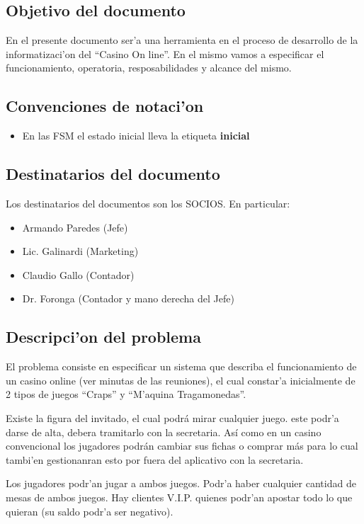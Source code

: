 \subsection{ Objetivo del documento	}

En el presente documento ser'a una herramienta en el proceso 
de desarrollo de la informatizaci'on del ``Casino On line''. En el mismo 
vamos a especificar el funcionamiento, operatoria, resposabilidades y alcance
del mismo.


\subsection{ Convenciones de notaci'on	}
\begin{itemize}
    \item En las FSM el estado inicial lleva la etiqueta \textbf{inicial}
\end{itemize}


\subsection{ Destinatarios del documento	}
Los destinatarios del documentos son los SOCIOS. En particular:

\begin{itemize}
    \item Armando Paredes (Jefe)
    \item Lic. Galinardi (Marketing)
    \item Claudio Gallo (Contador)
    \item Dr. Foronga (Contador y mano derecha del Jefe)
\end{itemize}


\subsection{ Descripci'on del problema }
El problema consiste en especificar un sistema que describa el funcionamiento
de un casino online (ver minutas de las reuniones),
el cual constar'a inicialmente de 2 tipos de juegos  ``Craps'' y ``M'aquina Tragamonedas''.

Existe la figura del invitado, el cual podrá mirar cualquier juego.
este podr'a darse de alta, debera tramitarlo con la secretaria.
Así como en un casino convencional los jugadores podrán cambiar 
sus fichas o comprar más para lo cual tambi'en gestionanran esto por fuera del aplicativo con 
la secretaria.

Los jugadores podr'an jugar a ambos juegos. Podr'a haber cualquier cantidad de mesas de ambos
juegos.
Hay clientes V.I.P. quienes podr'an apostar todo lo que quieran (su saldo podr'a ser negativo).


